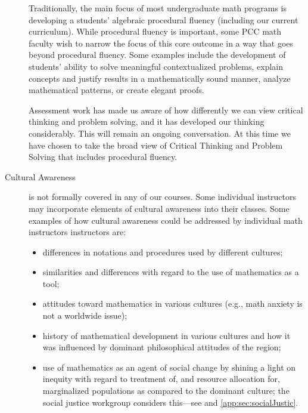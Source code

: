 \begin{description}
Traditionally, the main focus of most undergraduate math programs is developing
a students' algebraic procedural fluency (including our current curriculum).
While procedural fluency is important, some PCC math faculty wish to narrow the
focus of this core outcome in a way that goes beyond procedural fluency. Some
examples include the development of students' ability to solve meaningful
contextualized problems, explain concepts and justify results in a
mathematically sound manner, analyze mathematical patterns, or create elegant
proofs. 

Assessment work has made us aware of how differently we can view critical
thinking and problem solving, and it has developed our thinking considerably.
This will remain an ongoing conversation. At this time we have chosen to take
the broad view of Critical Thinking and Problem Solving that includes
procedural fluency. 

\item[Cultural Awareness] is not formally covered in any of our courses.  Some
  individual instructors may incorporate elements of cultural awareness into
  their classes.  Some examples of how cultural awareness could be addressed by
  individual math instructors instructors are: 
\begin{itemize}
\item differences in notations and procedures used by different cultures;
\item similarities and differences with regard to the use of mathematics as a
  tool;
\item attitudes toward mathematics in various cultures (e.g., math anxiety is
  not a worldwide issue);
\item history of mathematical  development in various cultures and how it was
  influenced by dominant philosophical attitudes of the region;
\item use of mathematics as an agent of social change by shining a light on
  inequity with regard to treatment of, and resource allocation for,
  marginalized populations as compared to the dominant culture; the social
  justice workgroup considers this---see  and
  \vref{app:sec:socialJustic}. 
\end{itemize}


\end{description}
